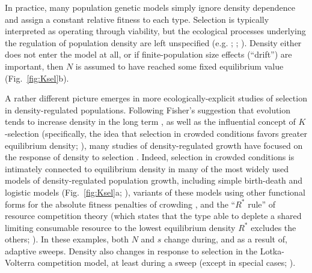 \documentclass[12pt]{article}
\begin{document}
In practice, many population genetic models simply ignore density dependence and assign a constant relative fitness to each type. Selection is typically interpreted as operating through viability, but the ecological processes underlying the regulation of population density are left unspecified (e.g. \citealt{gillespie_2004}; \citealt{nagylaki_1992}; \citealt{ewens_2004}). Density either does not enter the model at all, or if finite-population size effects (``drift'') are important, then $N$ is assumed to have reached some fixed equilibrium value (Fig.~\ref{fig:Ksel}b). 

A rather different picture emerges in more ecologically-explicit studies of selection in density-regulated populations. Following Fisher's suggestion that evolution tends to increase density in the long term \citep{fisher_1930, leon_1978, lande_2009}, as well as the influential concept of $K$-selection (specifically, the idea that selection in crowded conditions favors greater equilibrium density; \citealt{macarthur_1962}), many studies of density-regulated growth have focused on the response of density to selection \citep{kostitzin_1939,macarthur_1967,roughgarden_1979,christiansen_2004}. Indeed, selection in crowded conditions is intimately connected to equilibrium density in many of the most widely used models of density-regulated population growth, including simple birth-death \citep{kostitzin_1939} and logistic models (Fig.~\ref{fig:Ksel}a; \citealt{macarthur_1962,roughgarden_1979,boyce_1984}), variants of these models using other functional forms for the absolute fitness penalties of crowding \citep{kimura_1978,charlesworth_1971,lande_2009,nagylaki_1979,lande_2009}, and the ``$R^*$ rule'' of resource competition theory (which states that the type able to deplete a shared limiting consumable resource to the lowest equilibrium density $R^*$ excludes the others; \citealt{grover_1997}). In these examples, both $N$ and $s$ change during, and as a result of, adaptive sweeps. Density also changes in response to selection in the Lotka-Volterra competition model, at least during a sweep (except in special cases; \citealt{gill_1974,smouse_1976,mallet_2012}).
\end{document}
